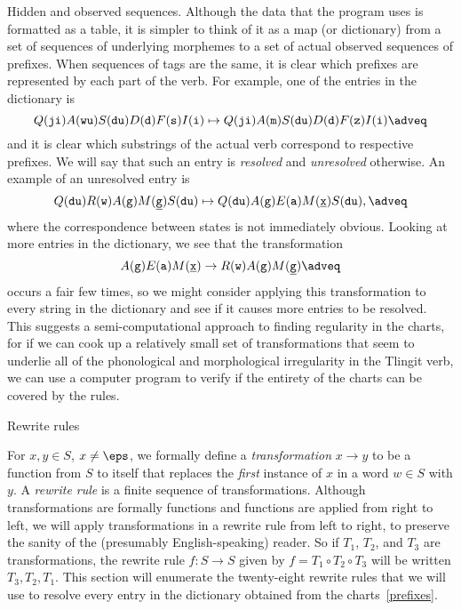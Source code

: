 \medskip\boldlabel Hidden and observed sequences.
Although the data that the program uses is formatted as a table, it is simpler to think of it as a map (or
dictionary) from a set of sequences of underlying morphemes to a set
of actual observed sequences of prefixes. When sequences of tags are the same, it is clear which prefixes
are represented by each part of the verb. For example, one of the entries in the dictionary is
$$\Q{ji}\A{wu}\S{du}\D{d}\F{s}\I{i}\mapsto\Q{ji}\A{m}\S{du}\D{d}\F{z}\I{i}\adveq$$
and it is clear which substrings of the actual verb correspond to respective prefixes. We will say that such
an entry is {\it resolved} and {\it unresolved} otherwise. An example of an unresolved entry is
$$\Q{du}\R{w}\A{g}\M{\g}\S{du}\mapsto \Q{du}\A{g}\E{a}\M{\x}\S{du},\adveq$$
where the correspondence between states is not immediately obvious.
Looking at more entries in the dictionary, we see that the transformation
$$\A{g}\E{a}\M{\underline{x}} \to \R{w}\A{g}\M{\underline{g}}\adveq$$
occurs a fair few times, so we might consider applying this transformation to every string in the dictionary
and see if it causes more entries to be resolved. This suggests a semi-computational approach to finding regularity
in the charts, for if we can cook up a relatively small set of transformations that seem to underlie
all of the phonological and morphological irregularity in the Tlingit verb, we can use a computer program to
verify if the entirety of the charts can be covered by the rules.

\advsect Rewrite rules

For $x,y\in S$, $x\neq\eps$, we formally define a
{\it transformation} $x\to y$ to be a function from $S$ to itself that
replaces the {\it first} instance of $x$ in a word $w\in S$ with $y$. A {\it rewrite rule} is a finite sequence
of transformations. Although transformations are formally functions and functions are applied from right to left,
we will apply transformations in a rewrite rule from
left to right, to preserve the sanity of the (presumably English-speaking) reader. So
if $T_1$, $T_2$, and $T_3$ are transformations,
the rewrite rule $f:S\to S$ given by $f = T_1 \circ T_2 \circ T_3$ will be written $T_3, T_2, T_1$. This section
will enumerate the twenty-eight rewrite rules that we will use to resolve every entry in the dictionary obtained
from the charts~\ref{prefixes}.

